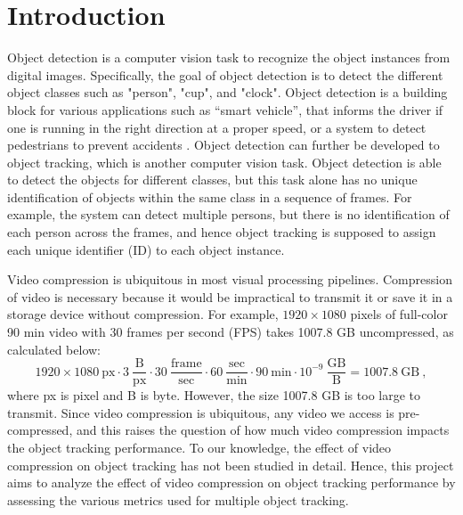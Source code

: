 \chapter{Introduction}
\label{chap:introduction}

Object detection is a computer vision task to recognize the object instances from digital images. Specifically, the goal of object detection is to detect the different object classes such as "person", "cup", and "clock". Object detection is a building block for various applications such as “smart vehicle”, that informs the driver if one is running in the right direction at a proper speed, or a system to detect pedestrians to prevent accidents \cite{gavrila_real-time_1999}. Object detection can further be developed to object tracking, which is another computer vision task. Object detection is able to detect the objects for different classes, but this task alone has no unique identification of objects within the same class in a sequence of frames. For example, the system can detect multiple persons, but there is no identification of each person across the frames, and hence object tracking is supposed to assign each unique identifier (ID) to each object instance.

Video compression is ubiquitous in most visual processing pipelines. Compression of video is necessary because it would be impractical to transmit it or save it in a storage device without compression. For example, $1920\times1080$ pixels of full-color 90 min video with 30 frames per second (FPS) takes 1007.8 GB uncompressed, as calculated below:
\begin{equation}
    1920 \times 1080~\text{px} \cdot 3~\frac{\text{B}}{\text{px}} \cdot 30~\frac{\text{frame}}{\text{sec}} \cdot 60~\frac{\text{sec}}{\text{min}} \cdot 90~\text{min} \cdot 10^{-9}~\frac{\text{GB}}{\text{B}}  = 1007.8~\text{GB}~,
\end{equation}
where px is pixel and B is byte. However, the size 1007.8 GB is too large to transmit. Since video compression is ubiquitous, any video we access is pre-compressed, and this raises the question of how much video compression impacts the object tracking performance. To our knowledge, the effect of video compression on object tracking has not been studied in detail. Hence, this project aims to analyze the effect of video compression on object tracking performance by assessing the various metrics used for multiple object tracking.







